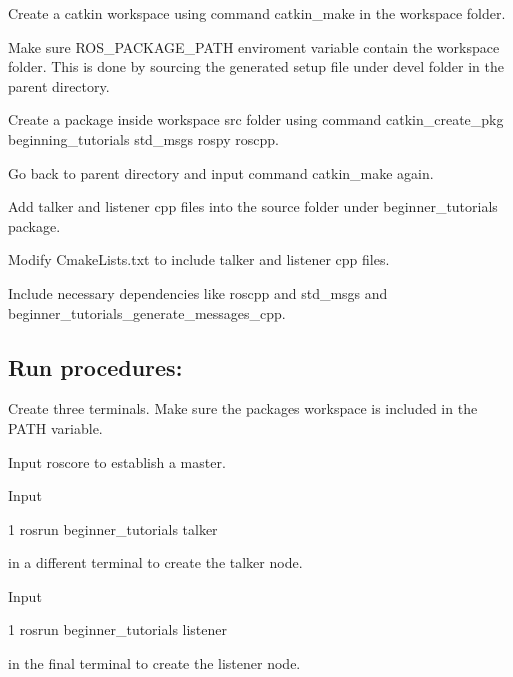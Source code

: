 
\begin{DoxyEnumerate}
\item Create a catkin workspace using command catkin\+\_\+make in the workspace folder.
\item Make sure R\+O\+S\+\_\+\+P\+A\+C\+K\+A\+G\+E\+\_\+\+P\+A\+TH enviroment variable contain the workspace folder. This is done by sourcing the generated setup file under devel folder in the parent directory.
\item Create a package inside workspace src folder using command catkin\+\_\+create\+\_\+pkg beginning\+\_\+tutorials std\+\_\+msgs rospy roscpp.
\item Go back to parent directory and input command catkin\+\_\+make again.
\item Add talker and listener cpp files into the source folder under beginner\+\_\+tutorials package.
\item Modify Cmake\+Lists.\+txt to include talker and listener cpp files.
\item Include necessary dependencies like roscpp and std\+\_\+msgs and beginner\+\_\+tutorials\+\_\+generate\+\_\+messages\+\_\+cpp.
\end{DoxyEnumerate}

\subsection*{Run procedures\+:}


\begin{DoxyEnumerate}
\item Create three terminals. Make sure the package\textquotesingle{}s workspace is included in the P\+A\+TH variable.
\item Input roscore to establish a master.
\item Input 
\begin{DoxyCode}
1 rosrun beginner\_tutorials talker
\end{DoxyCode}
 in a different terminal to create the talker node.
\item Input 
\begin{DoxyCode}
1 rosrun beginner\_tutorials listener
\end{DoxyCode}
 in the final terminal to create the listener node. 
\end{DoxyEnumerate}